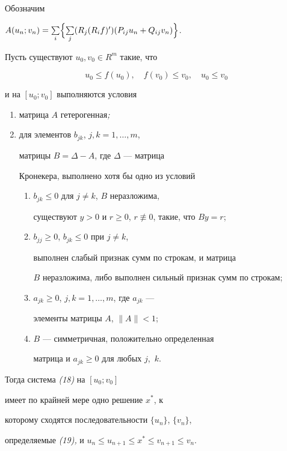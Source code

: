 Обозначим


$A(u_n;v_n)=\sum\limits_i\Bigl\{\sum\limits_j


(R_j(R_if)')(P_{ij}u_n+Q_{ij}v_n)\Bigr\}$.





\begin{thm} Пусть существуют $u_0,v_0\in R^m$ такие, что


$$


u_0\le f(u_0),\quad f(v_0)\le v_0,\quad u_0\le v_0


$$


и на $[u_0;v_0]$ выполняются условия


\begin{enumerate}


\item[1)] матрица $A$ гетерогенная{\em ;}


\item[2)] для элементов $b_{jk}$, $j,k=1,\dotsc,m$,


матрицы $B=\Delta-A$, где $\Delta$ --- матрица


Кронекера, выполнено хотя бы одно из условий


\begin{enumerate}


\item[а)] $b_{jk}\le 0$ для $j\ne k$, $B$ неразложима,


существуют $y>0$ и $r\ge 0$, $r\not\equiv 0$, такие, что $By=r$;


\item[б)] $b_{jj}\ge 0$, $b_{jk}\le 0$ при $j\ne k$,


выполнен слабый признак сумм по строкам, и матрица


$B$ неразложима, либо выполнен сильный признак сумм по строкам;


\item[в)] $a_{jk}\ge 0$, $j,k=1,\dotsc,m$, где $a_{jk}$ ---


элементы матрицы $A$, $\|A\|<1$;


\item[г)] $B$ --- симметричная, положительно определенная


матрица и $a_{jk}\ge 0$ для любых $j$,~$k$.


\end{enumerate}


\end{enumerate}





Тогда система {\em (18)} на $[u_0;v_0]$


имеет по крайней мере одно решение $x^*$, к


которому сходятся последовательности $\{u_n\}$, $\{v_n\}$,


определяемые {\em (19),} и $u_n\le u_{n+1}\le x^*\le v_{n+1}\le v_n$.


\end{thm}





